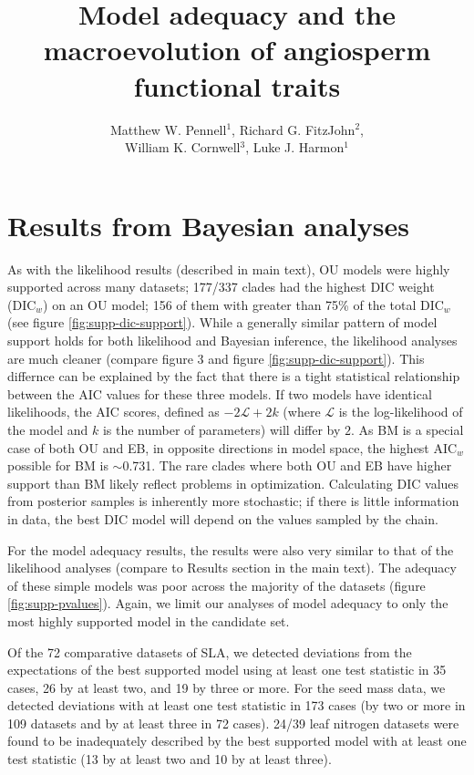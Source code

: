 \documentclass[12pt,twoside]{article}
\title{Model adequacy and the macroevolution of angiosperm functional traits}
\author{
Matthew W. Pennell$^{1}$, Richard G. FitzJohn$^2$,\\
William K. Cornwell$^{3}$, Luke J. Harmon$^{1}$
}
\date{}
\begin{document}
\maketitle

\section{Results from Bayesian analyses}
As with the likelihood results (described in main text), OU models were highly supported across many datasets; 
177/337 clades had the highest DIC weight (DIC$_w$) on an OU model; 156 of them with greater than 75\% of the total DIC$_w$ (see figure \ref{fig:supp-dic-support}). While a generally similar pattern of model support holds for both likelihood and Bayesian inference, the likelihood analyses are much cleaner (compare figure 3 and figure \ref{fig:supp-dic-support}). This differnce can be explained by the fact that there is a tight statistical relationship between the AIC values for these three models. If two models have identical likelihoods, the AIC scores, defined as $-2\mathcal{L} + 2k$ (where $\mathcal{L}$ is the log-likelihood of the model and $k$ is the number of parameters) will differ by $2$. As BM is a special case of both OU and EB, in opposite directions in model space, the highest AIC$_w$ possible for BM is $\sim$0.731. The rare clades where both OU and EB have higher support than BM likely reflect problems in optimization. Calculating DIC values from posterior samples is inherently more stochastic; if there is little information in data, the best DIC model will depend on the values sampled by the chain. 

For the model adequacy results, the results were also very similar to that of the likelihood analyses (compare to Results section in the main text). The adequacy of these simple models was poor across the majority of the datasets (figure \ref{fig:supp-pvalues}). Again, we limit our analyses of model adequacy to only the most highly supported model in the candidate set.

Of the 72 comparative datasets of SLA, we detected deviations from the expectations of the best supported model using at least one test statistic in 35 cases, 26 by at least two, and 19 by three or more.
For the seed mass data, we detected deviations with at least one test statistic in 173 cases (by two or more in 109 datasets and by at least three in 72 cases).
24/39 leaf nitrogen datasets were found to be inadequately described by the best supported model with at least one test statistic (13 by at least two and 10 by at least three).
\end{document}
